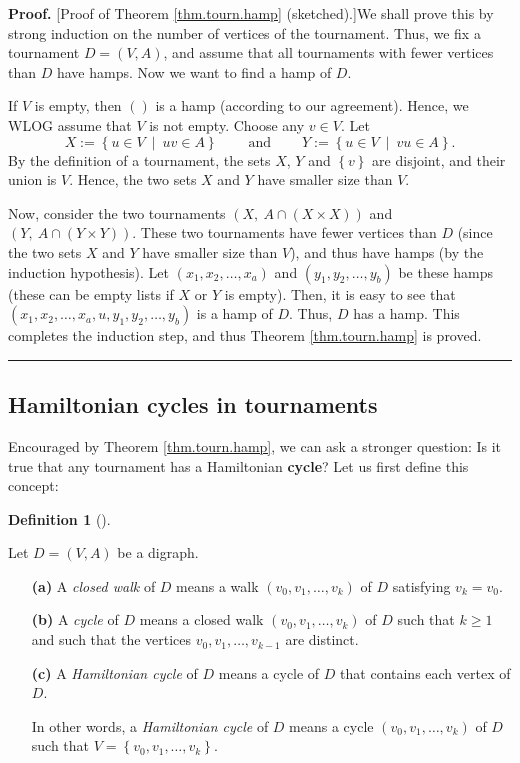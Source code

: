 \documentclass[numbers=enddot,12pt,final,onecolumn,notitlepage]{scrartcl}%
\numberwithin{exer}{subsection}
\theoremstyle{definition}
\newtheorem{defi}[theo]{Definition}
\newenvironment{definition}[1][]
{\begin{defi}[#1]\begin{leftbar}}
{\end{leftbar}\end{defi}}
\newenvironment{proof}[1][Proof]{\noindent\textbf{#1.} }{\ \rule{0.5em}{0.5em}}
\begin{document}
\begin{proof}
[Proof of Theorem \ref{thm.tourn.hamp} (sketched).]We shall prove this by
strong induction on the number of vertices of the tournament. Thus, we fix a
tournament $D=\left(  V,A\right)  $, and assume that all tournaments with
fewer vertices than $D$ have hamps. Now we want to find a hamp of $D$.

If $V$ is empty, then $\left(  {}\right)  $ is a hamp (according to our
agreement). Hence, we WLOG assume that $V$ is not empty. Choose any $v\in V$.
Let%
\[
X:=\left\{  u\in V\ \mid\ uv\in A\right\}  \ \ \ \ \ \ \ \ \ \ \text{and}%
\ \ \ \ \ \ \ \ \ \ Y:=\left\{  u\in V\ \mid\ vu\in A\right\}  .
\]
By the definition of a tournament, the sets $X$, $Y$ and $\left\{  v\right\}
$ are disjoint, and their union is $V$. Hence, the two sets $X$ and $Y$ have
smaller size than $V$.

Now, consider the two tournaments $\left(  X,\ A\cap\left(  X\times X\right)
\right)  $ and $\left(  Y,\ A\cap\left(  Y\times Y\right)  \right)  $. These
two tournaments have fewer vertices than $D$ (since the two sets $X$ and $Y$
have smaller size than $V$), and thus have hamps (by the induction
hypothesis). Let $\left(  x_{1},x_{2},\ldots,x_{a}\right)  $ and $\left(
y_{1},y_{2},\ldots,y_{b}\right)  $ be these hamps (these can be empty lists if
$X$ or $Y$ is empty). Then, it is easy to see that $\left(  x_{1},x_{2}%
,\ldots,x_{a},u,y_{1},y_{2},\ldots,y_{b}\right)  $ is a hamp of $D$. Thus, $D$
has a hamp. This completes the induction step, and thus Theorem
\ref{thm.tourn.hamp} is proved.
\end{proof}

\subsection{Hamiltonian cycles in tournaments}

Encouraged by Theorem \ref{thm.tourn.hamp}, we can ask a stronger question: Is
it true that any tournament has a Hamiltonian \textbf{cycle}? Let us first
define this concept:

\begin{definition}
Let $D=\left(  V,A\right)  $ be a digraph.

\begin{enumerate}
\item[\textbf{(a)}] A \emph{closed walk} of $D$ means a walk $\left(
v_{0},v_{1},\ldots,v_{k}\right)  $ of $D$ satisfying $v_{k}=v_{0}$.

\item[\textbf{(b)}] A \emph{cycle} of $D$ means a closed walk $\left(
v_{0},v_{1},\ldots,v_{k}\right)  $ of $D$ such that $k\geq1$ and such that the
vertices $v_{0},v_{1},\ldots,v_{k-1}$ are distinct.

\item[\textbf{(c)}] A \emph{Hamiltonian cycle} of $D$ means a cycle of $D$
that contains each vertex of $D$.

In other words, a \emph{Hamiltonian cycle} of $D$ means a cycle $\left(
v_{0},v_{1},\ldots,v_{k}\right)  $ of $D$ such that $V=\left\{  v_{0}%
,v_{1},\ldots,v_{k}\right\}  $.
\end{enumerate}
\end{definition}
\end{document}
